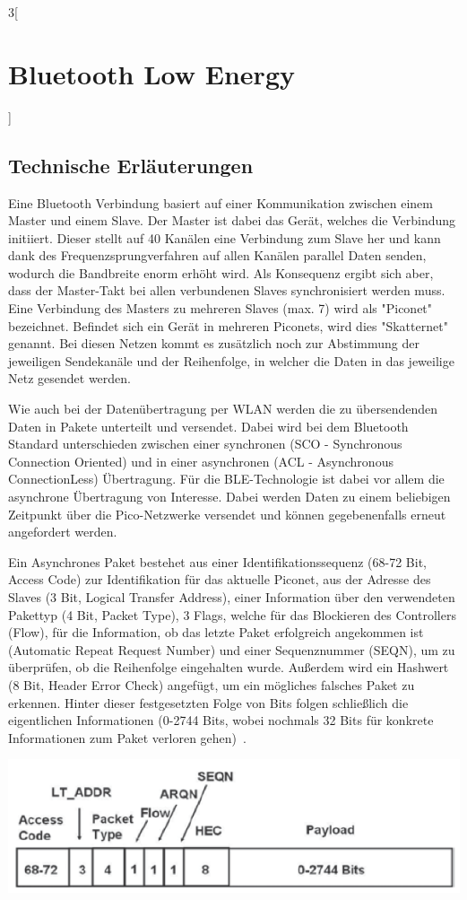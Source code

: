 \begin{multicols}{3}[\section{Bluetooth Low Energy}]
\subsection*{Technische Erläuterungen}
Eine Bluetooth Verbindung basiert auf einer Kommunikation zwischen einem Master und einem Slave. Der Master ist dabei das Gerät, welches die Verbindung initiiert. Dieser stellt auf 40 Kanälen eine Verbindung zum Slave her und kann dank des Frequenzsprungverfahren auf allen Kanälen parallel Daten senden, wodurch die Bandbreite enorm erhöht wird. Als Konsequenz ergibt sich aber, dass der Master-Takt bei allen verbundenen Slaves synchronisiert werden muss.
Eine Verbindung des Masters zu mehreren Slaves (max. 7) wird als "Piconet" bezeichnet. Befindet sich ein Gerät in mehreren Piconets, wird dies "Skatternet" genannt. Bei diesen Netzen kommt es zusätzlich noch zur Abstimmung der jeweiligen Sendekanäle und der Reihenfolge, in welcher die Daten in das jeweilige Netz gesendet werden.

Wie auch bei der Datenübertragung per WLAN werden die zu übersendenden Daten in Pakete unterteilt und versendet. Dabei wird bei dem Bluetooth Standard unterschieden zwischen einer synchronen (SCO - Synchronous Connection Oriented) und in einer asynchronen (ACL - Asynchronous ConnectionLess) Übertragung. Für die BLE-Technologie ist dabei vor allem die asynchrone Übertragung von Interesse. Dabei werden Daten zu einem beliebigen Zeitpunkt über die Pico-Netzwerke versendet und können gegebenenfalls erneut angefordert werden.

Ein Asynchrones Paket bestehet aus einer Identifikationssequenz (68-72 Bit, Access Code) zur Identifikation für das aktuelle Piconet, aus der Adresse des Slaves (3 Bit, Logical Transfer Address), einer Information über den verwendeten Pakettyp (4 Bit, Packet Type), 3 Flags, welche für das Blockieren des Controllers (Flow), für die Information, ob das letzte Paket erfolgreich angekommen ist (Automatic Repeat Request Number) und einer Sequenznummer (SEQN), um zu überprüfen, ob die Reihenfolge eingehalten wurde. Außerdem wird ein Hashwert (8 Bit, Header Error Check) angefügt, um ein mögliches falsches Paket zu erkennen. Hinter dieser festgesetzten Folge von Bits folgen schließlich die eigentlichen Informationen (0-2744 Bits, wobei nochmals 32 Bits für konkrete Informationen zum Paket verloren gehen)~\cite{BLE.1}.

\begin{Figure}
\includegraphics[width=\linewidth]{Kapitel/BLE/Grafiken/paket.png}
\end{Figure}


\end{multicols}
